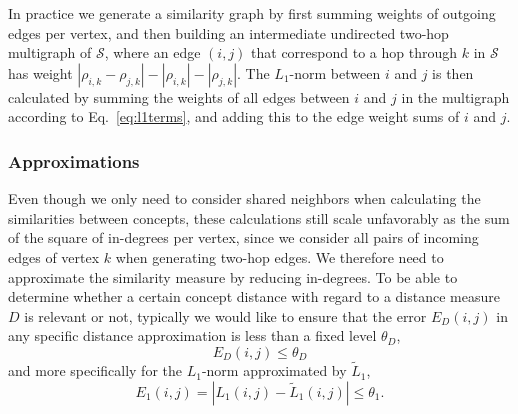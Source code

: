 \documentclass{sig-alternate}
\newcommand{\rn}[1]{\rho_{#1}}
\newcommand{\nm}[1]{L_1(#1)}
\newcommand{\anm}[1]{\tilde{L}_1(#1)}
\begin{document}
In practice we generate a similarity graph by first summing weights of outgoing edges per vertex, and then building an
intermediate undirected two-hop multigraph of $\mathcal{S}$, where an edge $(i, j)$ that correspond to a hop through
$k$ in $\mathcal{S}$ has weight $|\rn{i, k} - \rn{j, k}| - |\rn{i, k}| - |\rn{j, k}|$. The $L_1$-norm between $i$ and
$j$ is then calculated by summing the weights of all edges between $i$ and $j$ in the multigraph according to Eq.\
\ref{eq:l1terms}, and adding this to the edge weight sums of $i$ and $j$.

\subsubsection{Approximations}
\label{subsec:approximations}
Even though we only need to consider shared neighbors when calculating the similarities between concepts, these
calculations still scale unfavorably as the sum of the square of in-degrees per vertex, since we consider all pairs of
incoming edges of vertex $k$ when generating two-hop edges. We therefore need to approximate the similarity measure by
reducing in-degrees. To be able to determine whether a certain concept distance with regard to a distance measure $D$ is
relevant or not, typically we would like to ensure that the error $E_{D}(i,j)$ in any specific distance approximation
is less than a fixed level $\theta_D$,
\begin{equation}
E_{D}(i,j) \leq \theta_D
\end{equation}
and more specifically for the $L_1$-norm approximated by $\tilde{L}_1$,
\begin{equation}
E_1(i,j) = | \nm{i,j}  - \anm{i,j}  | \leq \theta_1.
\end{equation}


\end{document}
